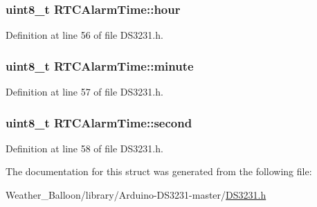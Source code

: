 \subsubsection[{\texorpdfstring{hour}{hour}}]{\setlength{\rightskip}{0pt plus 5cm}uint8\+\_\+t R\+T\+C\+Alarm\+Time\+::hour}\hypertarget{struct_r_t_c_alarm_time_af80194d88cddcc273b97531f8b799138}{}\label{struct_r_t_c_alarm_time_af80194d88cddcc273b97531f8b799138}


Definition at line 56 of file D\+S3231.\+h.

\subsubsection[{\texorpdfstring{minute}{minute}}]{\setlength{\rightskip}{0pt plus 5cm}uint8\+\_\+t R\+T\+C\+Alarm\+Time\+::minute}\hypertarget{struct_r_t_c_alarm_time_ae33cf5cda7523c05a3559485d2d26019}{}\label{struct_r_t_c_alarm_time_ae33cf5cda7523c05a3559485d2d26019}


Definition at line 57 of file D\+S3231.\+h.

\subsubsection[{\texorpdfstring{second}{second}}]{\setlength{\rightskip}{0pt plus 5cm}uint8\+\_\+t R\+T\+C\+Alarm\+Time\+::second}\hypertarget{struct_r_t_c_alarm_time_a5367af27263fcbab3975c6c88b1be7bf}{}\label{struct_r_t_c_alarm_time_a5367af27263fcbab3975c6c88b1be7bf}


Definition at line 58 of file D\+S3231.\+h.



The documentation for this struct was generated from the following file\+:\begin{DoxyCompactItemize}
\item 
Weather\+\_\+\+Balloon/library/\+Arduino-\/\+D\+S3231-\/master/\hyperlink{_d_s3231_8h}{D\+S3231.\+h}\end{DoxyCompactItemize}
